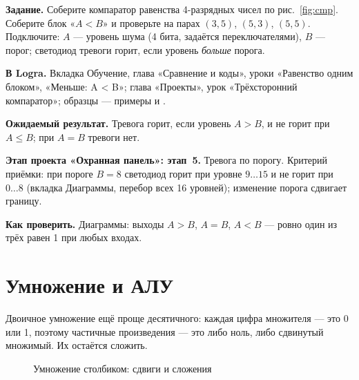 \begin{diybox}
\textbf{Задание.}  Соберите компаратор равенства 4-разрядных чисел
по рис.~\ref{fig:cmp}.  Соберите блок «$A<B$» и проверьте на
парах $(3,5)$, $(5,3)$, $(5,5)$.  Подключите: $A$ --- уровень шума
(4 бита, задаётся переключателями), $B$ --- порог; светодиод тревоги горит,
если уровень \emph{больше} порога.

\textbf{В Logra.} Вкладка Обучение, глава «Сравнение и коды»,
уроки «Равенство одним блоком», «Меньше: A < B»; глава «Проекты», урок
«Трёхсторонний компаратор»;
образцы --- примеры  и .

\textbf{Ожидаемый результат.} Тревога горит, если уровень $A>B$, и не горит
при $A\le B$; при $A=B$ тревоги нет.

\textbf{Этап проекта «Охранная панель»: этап~5.} Тревога по порогу.
Критерий приёмки: при пороге $B=8$ светодиод горит при уровне
$9\ldots 15$ и не горит при $0\ldots 8$ (вкладка Диаграммы, перебор
всех 16 уровней); изменение порога сдвигает границу.

\textbf{Как проверить.} Диаграммы: выходы $A>B$, $A=B$, $A<B$ --- ровно один
из трёх равен 1 при любых входах.
\end{diybox}

\section{Умножение и АЛУ}

Двоичное умножение ещё проще десятичного: каждая цифра множителя --- это 0
или 1, поэтому частичные произведения --- это либо ноль, либо сдвинутый
множимый. Их остаётся сложить.

\begin{figure}[H]
\centering
{}
\caption{Умножение столбиком: сдвиги и сложения}
\end{figure}

